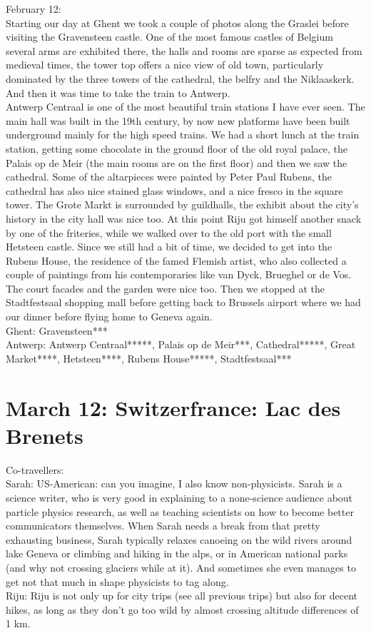 February 12:\\
Starting our day at Ghent we took a couple of photos along the Graslei before visiting the Gravensteen castle. One of the most famous castles of Belgium several arms are exhibited there, the halls and rooms are sparse as expected from medieval times, the tower top offers a nice view of old town, particularly dominated by the three towers of the cathedral, the belfry and the Niklaaskerk. And then it was time to take the train to Antwerp. \\
Antwerp Centraal is one of the most beautiful train stations I have ever seen. The main hall was built in the 19th century, by now new platforms have been built underground mainly for the high speed trains. We had a short lunch at the train station, getting some chocolate in the ground floor of the old royal palace, the Palais op de Meir (the main rooms are on the first floor) and then we saw the cathedral. Some of the altarpieces were painted by Peter Paul Rubens, the cathedral has also nice stained glass windows, and a nice fresco in the square tower. The Grote Markt is surrounded by guildhalls, the exhibit about the city's history in the city hall was nice too. At this point Riju got himself another snack by one of the friteries, while we walked over to the old port with the small Hetsteen castle. Since we still had a bit of time, we decided to get into the Rubens House, the residence of the famed Flemish artist, who also collected a couple of paintings from his contemporaries like van Dyck, Brueghel or de Vos. The court facades and the garden were nice too. Then we stopped at the Stadtfestsaal shopping mall before getting back to Brussels airport where we had our dinner before flying home to Geneva again.\\

Ghent: Gravensteen***\\
Antwerp: Antwerp Centraal*****, Palais op de Meir***, Cathedral*****, Great Market****, Hetsteen****, Rubens House*****, Stadtfestsaal***

\section{March 12: Switzerfrance: Lac des Brenets}
\label{2017:LacDesBrenets}

Co-travellers: \\
Sarah:
US-American: can you imagine, I also know non-physicists. Sarah is a science writer, who is very good in explaining to a none-science audience about particle physics research, as well as teaching scientists on how to become better communicators themselves. When Sarah needs a break from that pretty exhausting business, Sarah typically relaxes canoeing on the wild rivers around lake Geneva or climbing and hiking in the alps, or in American national parks (and why not crossing glaciers while at it). And sometimes she even manages to get not that much in shape physicists to tag along.\\
Riju:
Riju is not only up for city trips (see all previous trips) but also for decent hikes, as long as they don't go too wild by almost crossing altitude differences of 1 km. \\

